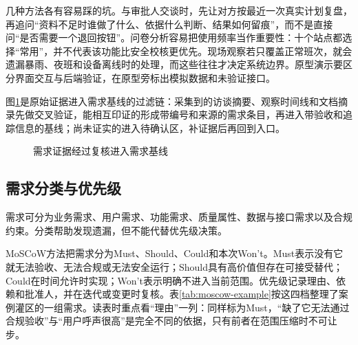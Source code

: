 几种方法各有容易踩的坑。与审批人交谈时，先让对方按最近一次真实计划复盘，再追问“资料不足时谁做了什么、依据什么判断、结果如何留痕”，而不是直接问“是否需要一个退回按钮”。问卷分析容易把使用频率当作重要性：十个站点都选择“常用”，并不代表该功能比安全校核更优先。现场观察若只覆盖正常班次，就会遗漏暴雨、夜班和设备离线时的处理，而这些往往才决定系统边界。原型演示要区分界面交互与后端验证，在原型旁标出模拟数据和未验证接口。

图\ref{fig:ch02-requirement-evidence}是原始证据进入需求基线的过滤链：采集到的访谈摘要、观察时间线和文档摘录先做交叉验证，能相互印证的形成带编号和来源的需求条目，再进入带验收和追踪信息的基线；尚未证实的进入待确认区，补证据后再回到入口。

\begin{figure}[htbp]
\centering
{}
\caption{需求证据经过复核进入需求基线}
\label{fig:ch02-requirement-evidence}
\end{figure}

\subsection{需求分类与优先级}

需求可分为业务需求、用户需求、功能需求、质量属性、数据与接口需求以及合规约束。分类帮助发现遗漏，但不能代替优先级决策。

MoSCoW方法把需求分为Must、Should、Could和本次Won't。Must表示没有它就无法验收、无法合规或无法安全运行；Should具有高价值但存在可接受替代；Could在时间允许时实现；Won't表示明确不进入当前范围。优先级记录理由、依赖和批准人，并在迭代或变更时复核。表\ref{tab:moscow-example}按这四档整理了案例灌区的一组需求。读表时重点看“理由”一列：同样标为Must，“缺了它无法通过合规验收”与“用户呼声很高”是完全不同的依据，只有前者在范围压缩时不可让步。

